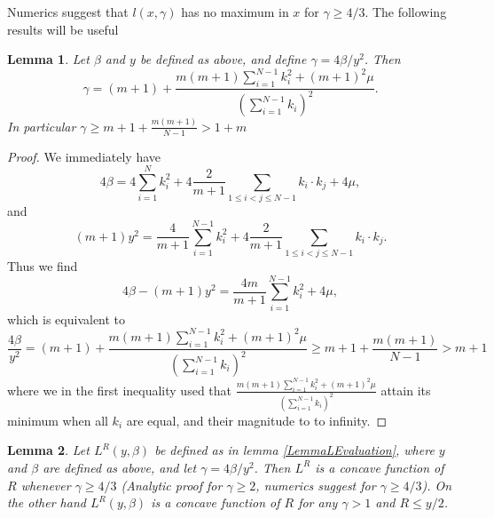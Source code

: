 \documentclass[a4paper,11pt]{article}
\newtheorem{lemma}{Lemma}
\numberwithin{equation}{section}
\begin{document}
Numerics suggest that $ l(x,\gamma) $ has no maximum in $ x $ for  $ \gamma\geq4/3 $. The following results will be useful
\begin{lemma}
	Let $ \beta $ and $ y $ be defined as above, and define $ \gamma=4\beta/y^2 $. Then\begin{equation}
	\gamma=(m+1)+\frac{m(m+1)\sum_{i=1}^{N-1}k_i^2+(m+1)^2\mu}{\left(\sum_{i=1}^{N-1}k_i\right)^2}.
	\end{equation} In particular $ \gamma\geq m+1+\frac{m(m+1)}{N-1}>1+m $
\end{lemma}
\begin{proof}
	We immediately have \begin{equation}
	4\beta=4\sum_{i=1}^{N}k_i^2+4\frac{2}{m+1}\sum_{1\leq i<j\leq N-1}k_i\cdot k_j+4\mu,
	\end{equation}
	and \begin{equation}
	(m+1)y^2=\frac{4}{m+1}\sum_{i=1}^{N-1}k_i^2+4\frac{2}{m+1}\sum_{1\leq i<j\leq N-1}k_i\cdot k_j.
	\end{equation}
	Thus we find \begin{equation}
	4\beta-(m+1)y^2=\frac{4m}{m+1}\sum_{i=1}^{N-1}k_i^2+4\mu,
	\end{equation}
	which is equivalent to \begin{equation}
	\frac{4\beta}{y^2}=(m+1)+\frac{m(m+1)\sum_{i=1}^{N-1}k_i^2+(m+1)^2\mu}{\left(\sum_{i=1}^{N-1}k_i\right)^2}\geq m+1+\frac{m(m+1)}{N-1}>m+1
	\end{equation}
	where we in the first inequality used that $ \frac{m(m+1)\sum_{i=1}^{N-1}k_i^2+(m+1)^2\mu}{\left(\sum_{i=1}^{N-1}k_i\right)^2} $ attain its minimum when all $ k_i $ are equal, and their magnitude to to infinity.
\end{proof}
\begin{lemma}\label{LemmaLConcave}
	Let $ L^R(y,\beta) $ be defined as in lemma \ref{LemmaLEvaluation}, where $ y $ and $ \beta $ are defined as above, and let $ \gamma=4\beta/y^2 $. Then $ L^R $ is a concave function of $ R $ whenever $ \gamma\geq4/3 $ (Analytic proof for $ \gamma\geq2 $, numerics suggest for $ \gamma\geq4/3 $). On the other hand $ L^R(y,\beta) $ is a concave function of $ R $ for any $ \gamma>1 $ and $ R\leq y/2 $.
\end{lemma}
\end{document}

